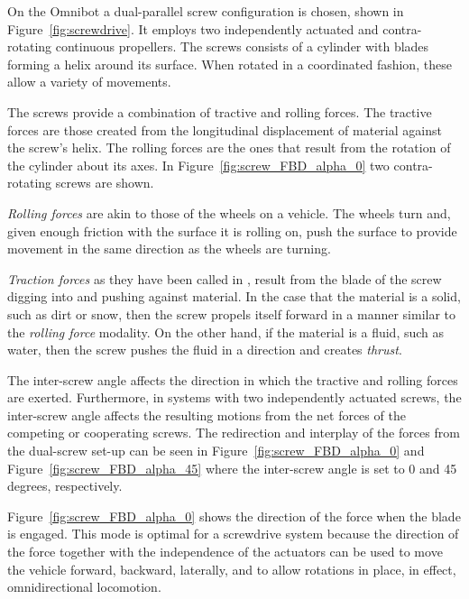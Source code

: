 
On the Omnibot a dual-parallel screw configuration is chosen, shown in Figure~\ref{fig:screwdrive}. It employs two independently actuated and contra-rotating continuous propellers. The screws consists of a cylinder with blades forming a helix around its surface. When rotated in a coordinated fashion, these allow a variety of movements. 

The screws provide a combination of tractive and rolling forces. The tractive forces are those created from the longitudinal displacement of material against the screw's helix. The rolling forces are the ones that result from the rotation of the cylinder about its axes. In Figure~\ref{fig:screw_FBD_alpha_0} two contra-rotating screws are shown.  

\emph{Rolling forces} are akin to those of the wheels on a vehicle. The wheels turn and, given enough friction with the surface it is rolling on, push the surface to provide movement in the same direction as the wheels are turning. 

\emph{Traction forces} as they have been called in \cite{Freeberg2010}, result from the blade of the screw digging into and pushing against material. In the case that the material is a solid, such as dirt or snow, then the screw propels itself forward in a manner similar to the \emph{rolling force} modality. On the other hand, if the material is a fluid, such as water, then the screw pushes the fluid in a direction and creates \emph{thrust}.

The inter-screw angle affects the direction in which the tractive and rolling forces are exerted. Furthermore, in systems with two independently actuated screws, the inter-screw angle affects the resulting motions from the net forces of the competing or cooperating screws. The redirection and interplay of the forces from the dual-screw set-up can be seen in Figure~\ref{fig:screw_FBD_alpha_0} and Figure~\ref{fig:screw_FBD_alpha_45} where the inter-screw angle is set to 0 and 45 degrees, respectively. 

Figure~\ref{fig:screw_FBD_alpha_0} shows the direction of the force when the blade is engaged. This mode is optimal for a screwdrive system because the direction of the force together with the independence of the actuators can be used to move the vehicle forward, backward, laterally, and to allow rotations in place, in effect, omnidirectional locomotion. 

